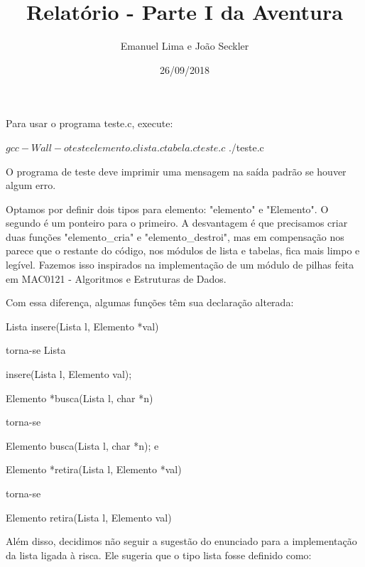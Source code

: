 \documentclass{article}
\title{Relatório - Parte I da Aventura}
\date{26/09/2018}
\author{Emanuel Lima e João Seckler}
\begin{document}
\maketitle

Para usar o programa teste.c, execute:

\begin{spverbatim}
$ gcc -Wall -o teste elemento.c lista.c tabela.c teste.c
$ ./teste.c
\end{spverbatim}
  
\medskip

O programa de teste deve imprimir uma mensagem na saída padrão se houver algum  erro.

Optamos por definir dois tipos para elemento: "elemento" e "Elemento". O segundo é um ponteiro para o primeiro. A desvantagem é que precisamos criar duas funções "elemento\_cria" e "elemento\_destroi", mas em compensação nos parece que o restante do código, nos módulos de lista e tabelas, fica mais limpo e legível. Fazemos isso inspirados na implementação de um módulo de pilhas feita em MAC0121 - Algoritmos e Estruturas de Dados.

Com essa diferença, algumas funções têm sua declaração alterada:

\begin{spverbatim}
  Lista insere(Lista l, Elemento *val)
\end{spverbatim} \medskip
torna-se Lista
\begin{spverbatim}
  insere(Lista l, Elemento val);
\end{spverbatim} \medskip

\begin{spverbatim}
  Elemento *busca(Lista l, char *n)
\end{spverbatim} \medskip
torna-se
\begin{spverbatim}
  Elemento busca(Lista l, char *n); e
\end{spverbatim} \medskip

\begin{spverbatim}
  Elemento *retira(Lista l, Elemento *val)
\end{spverbatim} \medskip
torna-se
\begin{spverbatim}
  Elemento retira(Lista l, Elemento val)
\end{spverbatim} \medskip

Além disso, decidimos não seguir a sugestão do enunciado para a implementação da lista ligada à risca. Ele sugeria que o tipo lista fosse definido como:
\end{document}
